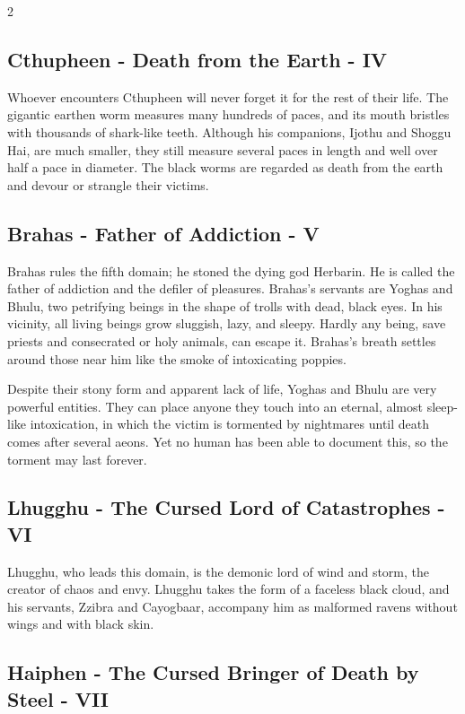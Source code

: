 \begin{multicols}{2}
{\subsection{Cthupheen - Death from the Earth - IV}\label{subsec:cthupheen-der-tod-aus-der-erde}

Whoever encounters Cthupheen will never forget it for the rest of their life. The gigantic earthen worm measures many hundreds of paces, and its mouth bristles with thousands of shark-like teeth. Although his companions, Ijothu and Shoggu Hai, are much smaller, they still measure several paces in length and well over half a pace in diameter. The black worms are regarded as death from the earth and devour or strangle their victims.

\subsection{Brahas - Father of Addiction - V}\label{subsec:brahas-vater-der-sucht}

Brahas rules the fifth domain; he stoned the dying god Herbarin. He is called the father of addiction and the defiler of pleasures. Brahas's servants are Yoghas and Bhulu, two petrifying beings in the shape of trolls with dead, black eyes. In his vicinity, all living beings grow sluggish, lazy, and sleepy. Hardly any being, save priests and consecrated or holy animals, can escape it. Brahas's breath settles around those near him like the smoke of intoxicating poppies.

Despite their stony form and apparent lack of life, Yoghas and Bhulu are very powerful entities. They can place anyone they touch into an eternal, almost sleep-like intoxication, in which the victim is tormented by nightmares until death comes after several aeons. Yet no human has been able to document this, so the torment may last forever.

\subsection{Lhugghu - The Cursed Lord of Catastrophes - VI}\label{subsec:lhugghu-der-verfluchte-herr-der-katastrophen}

Lhugghu, who leads this domain, is the demonic lord of wind and storm, the creator of chaos and envy. Lhugghu takes the form of a faceless black cloud, and his servants, Zzibra and Cayogbaar, accompany him as malformed ravens without wings and with black skin.

\subsection{Haiphen - The Cursed Bringer of Death by Steel - VII}\label{subsec:haiphen-der-verfluchte-bringer-des-todes-mit-dem-stahl}

}
\end{multicols}
